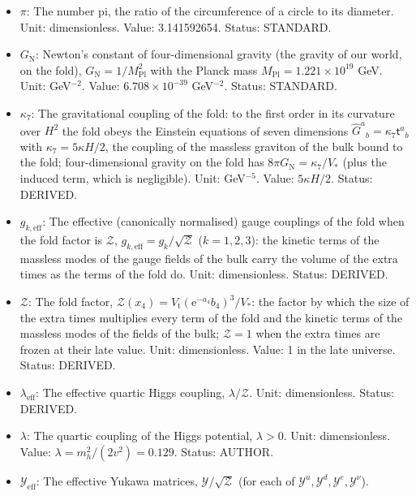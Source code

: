 \documentclass[
  10pt,
]{article}
\begin{document}
\begin{itemize}
\item
  \(\pi\): The number pi, the ratio of the circumference of a circle to
  its diameter. Unit: dimensionless. Value: 3.141592654. Status:
  STANDARD.
\item
  \(G_{\mathrm{N}}\): Newton's constant of four-dimensional gravity (the
  gravity of our world, on the fold),
  \(G_{\mathrm{N}} = 1/M_{\mathrm{Pl}}^2\) with the Planck mass
  \(M_{\mathrm{Pl}} = 1.221\times10^{19}\) GeV. Unit: GeV\(^{-2}\).
  Value: \(6.708\times10^{-39}\) GeV\(^{-2}\). Status: STANDARD.
\item
  \(\kappa_7\): The gravitational coupling of the fold: to the first
  order in its curvature over \(H^2\) the fold obeys the Einstein
  equations of seven dimensions
  \(\hat G^a{}_b = \kappa_7\mathsf{t}^a{}_b\) with
  \(\kappa_7 = 5\kappa H/2\), the coupling of the massless graviton of
  the bulk bound to the fold; four-dimensional gravity on the fold has
  \(8\pi G_{\mathrm{N}} = \kappa_7/V_*\) (plus the induced term, which
  is negligible). Unit: GeV\(^{-5}\). Value: \(5\kappa H/2\). Status:
  DERIVED.
\item
  \(g_{k,\mathrm{eff}}\): The effective (canonically normalised) gauge
  couplings of the fold when the fold factor is \(\mathcal{Z}\),
  \(g_{k,\mathrm{eff}} = g_k/\sqrt{\mathcal{Z}}\) (\(k = 1, 2, 3\)): the
  kinetic terms of the massless modes of the gauge fields of the bulk
  carry the volume of the extra times as the terms of the fold do. Unit:
  dimensionless. Status: DERIVED.
\item
  \(\mathcal{Z}\): The fold factor,
  \(\mathcal{Z}(x_4) = V_{\mathrm{t}}(\mathrm{e}^{-a_4}b_4)^3/V_*\): the
  factor by which the size of the extra times multiplies every term of
  the fold and the kinetic terms of the massless modes of the fields of
  the bulk; \(\mathcal{Z} = 1\) when the extra times are frozen at their
  late value. Unit: dimensionless. Value: 1 in the late universe.
  Status: DERIVED.
\item
  \(\lambda_{\mathrm{eff}}\): The effective quartic Higgs coupling,
  \(\lambda/\mathcal{Z}\). Unit: dimensionless. Status: DERIVED.
\item
  \(\lambda\): The quartic coupling of the Higgs potential,
  \(\lambda > 0\). Unit: dimensionless. Value:
  \(\lambda = m_h^2/(2v^2) = 0.129\). Status: AUTHOR.
\item
  \(\mathcal{Y}_{\mathrm{eff}}\): The effective Yukawa matrices,
  \(\mathcal{Y}/\sqrt{\mathcal{Z}}\) (for each of
  \(\mathcal{Y}^{u}, \mathcal{Y}^{d}, \mathcal{Y}^{e}, \mathcal{Y}^{\nu}\)).

\end{itemize}
\end{document}
